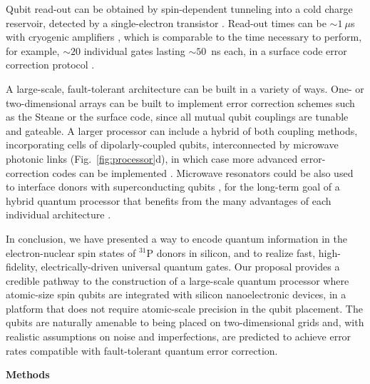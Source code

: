 \documentclass[aps,prb,superscriptaddress,nobibnotes,preprint]{revtex4-1}%
\begin{document}
Qubit read-out can be obtained by spin-dependent tunneling into a cold charge reservoir, detected by a single-electron transistor \cite{Morello2010}. Read-out times can be $\sim1~\mu$s with cryogenic amplifiers \cite{Curry2015}, which is comparable to the time necessary to perform, for example, $\sim 20$ individual gates lasting $\sim 50$~ns each, in a surface code error correction protocol \cite{Fowler2012}.

A large-scale, fault-tolerant architecture can be built in a variety of ways. One- or two-dimensional arrays can be built to implement error correction schemes such as the Steane \cite{Steane1996} or the surface \cite{Fowler2012} code, since all mutual qubit couplings are tunable and gateable. A larger processor can include a hybrid of both coupling methods, incorporating cells of dipolarly-coupled qubits, interconnected by microwave photonic links (Fig.~\ref{fig:processor}d), in which case more advanced error-correction codes can be implemented \cite{Knill2005,Nickerson2013,Terhal2015,Li2017}. Microwave resonators could be also used to interface donors with superconducting qubits \cite{Barends2014,Devoret2013}, for the long-term goal of a hybrid quantum processor that benefits from the many advantages of each individual architecture \cite{Xiang2013}.

In conclusion, we have presented a way to encode quantum information in the electron-nuclear spin states of $^{31}$P donors in silicon, and to realize fast, high-fidelity, electrically-driven universal quantum gates. Our proposal provides a credible pathway to the construction of a large-scale quantum processor where atomic-size spin qubits are integrated with silicon nanoelectronic devices, in a platform that does not require atomic-scale precision in the qubit placement. The qubits are naturally amenable to being placed on two-dimensional grids and, with realistic assumptions on noise and imperfections, are predicted to achieve error rates compatible with fault-tolerant quantum error correction.


\vspace{3mm}
\noindent\textbf{Methods}
\end{document}
